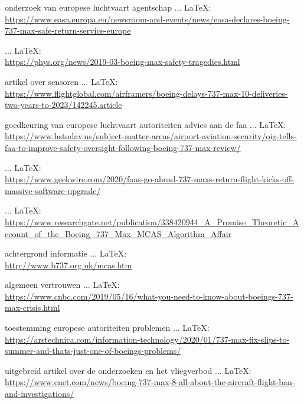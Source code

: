 \begin{thebibliography}{99}
{{{{{{{    onderzoek van europese luchtvaart agentschap
     ... \LaTeX:\\ \url{https://www.easa.europa.eu/newsroom-and-events/news/easa-declares-boeing-737-max-safe-return-service-europe}
    
    \veiligheidsvraagstuk
     ... \LaTeX:\\ \url{https://phys.org/news/2019-03-boeing-max-safety-tragedies.html}
    
    artikel over sensoren
     ... \LaTeX:\\ \url{https://www.flightglobal.com/airframers/boeing-delays-737-max-10-deliveries-two-years-to-2023/142245.article}
    
    goedkeuring van europese luchtvaart autoriteiten
    advies aan de faa
     ... \LaTeX:\\ \url{https://www.hstoday.us/subject-matter-areas/airport-aviation-security/oig-tells-faa-to-improve-safety-oversight-following-boeing-737-max-review/}
    
     ... \LaTeX:\\ \url{https://www.geekwire.com/2020/faas-go-ahead-737-maxs-return-flight-kicks-off-massive-software-upgrade/}
    
     ... \LaTeX:\\ \url{https://www.researchgate.net/publication/338420944_A_Promise_Theoretic_Account_of_the_Boeing_737_Max_MCAS_Algorithm_Affair}
    
    achtergrond informatie
     ... \LaTeX:\\ \url{http://www.b737.org.uk/mcas.htm}
    
    algemeen vertrouwen
     ... \LaTeX:\\ \url{https://www.cnbc.com/2019/05/16/what-you-need-to-know-about-boeings-737-max-crisis.html}
    
    toestemming europese autoriteiten
    problemen
     ... \LaTeX:\\ \url{https://arstechnica.com/information-technology/2020/01/737-max-fix-slips-to-summer-and-thats-just-one-of-boeings-problems/}
    
    uitgebreid artikel over de onderzoeken en het vliegverbod
     ... \LaTeX:\\ \url{https://www.cnet.com/news/boeing-737-max-8-all-about-the-aircraft-flight-ban-and-investigations/}
    
}}}}}}}
\end{thebibliography}
